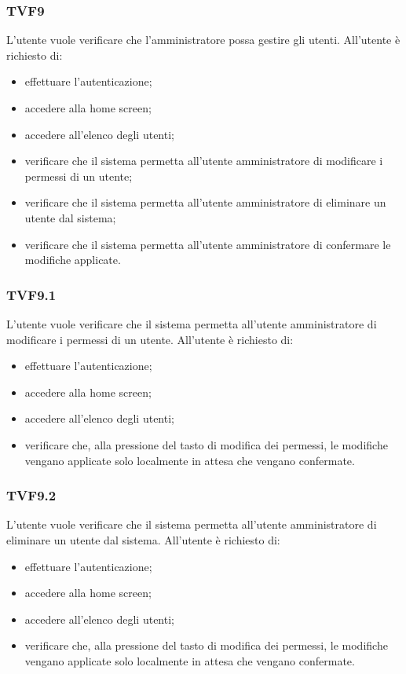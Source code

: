 		\subsubsection{TVF9}
			L'utente vuole verificare che l'amministratore possa gestire gli utenti. All'utente è richiesto di:
			\begin{itemize}
				\item effettuare l'autenticazione;
				\item accedere alla home screen;
				\item accedere all'elenco degli utenti;
				\item verificare che il sistema permetta all'utente amministratore di modificare i permessi di un utente;
				\item verificare che il sistema permetta all'utente amministratore di eliminare un utente dal sistema;
				\item verificare che il sistema permetta all'utente amministratore di confermare le modifiche applicate.
			\end{itemize}
			
		\subsubsection{TVF9.1}
			L'utente vuole verificare che il sistema permetta all'utente amministratore di modificare i permessi di un utente. All'utente è richiesto di:
			\begin{itemize}
				\item effettuare l'autenticazione;
				\item accedere alla home screen;
				\item accedere all'elenco degli utenti;
				\item verificare che, alla pressione del tasto di modifica dei permessi, le modifiche vengano applicate solo localmente in attesa che vengano confermate.
			\end{itemize}
			
		\subsubsection{TVF9.2}
			L'utente vuole verificare che il sistema permetta all'utente amministratore di eliminare un utente dal sistema. All'utente è richiesto di:
			\begin{itemize}
				\item effettuare l'autenticazione;
				\item accedere alla home screen;
				\item accedere all'elenco degli utenti;
				\item verificare che, alla pressione del tasto di modifica dei permessi, le modifiche vengano applicate solo localmente in attesa che vengano confermate.
			\end{itemize}
			

